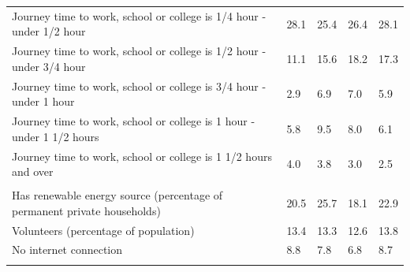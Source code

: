 \documentclass{article}
\begin{document}
\begin{table}[h]
\begin{tabular}{KTTTT}
Journey time to work, school or college is 1/4 hour - under 1/2 hour & 28.1& 25.4& 26.4& 28.1\\
Journey time to work, school or college is 1/2 hour - under 3/4 hour & 11.1& 15.6& 18.2& 17.3\\
Journey time to work, school or college is 3/4 hour - under 1 hour & 2.9& 6.9& 7.0& 5.9\\
Journey time to work, school or college is 1 hour - under 1 1/2 hours & 5.8& 9.5& 8.0& 6.1\\
Journey time to work, school or college is 1 1/2 hours and over & 4.0& 3.8& 3.0& 2.5\\
\hline
    \\ 
    \hline
Has renewable energy source (percentage of permanent private households) & 20.5& 25.7& 18.1& 22.9\\
    \hline
Volunteers (percentage of population) & 13.4& 13.3& 12.6& 13.8\\
    \hline
No internet connection& 8.8& 7.8& 6.8& 8.7\\
\hline
\end{tabular}
\end{table}
\end{document}
